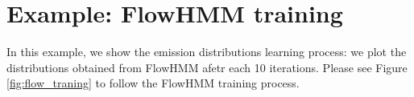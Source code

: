\documentclass[shortabstract]{iithesis}
\DeclareMathOperator*{\argmin}{arg\,min}
\begin{document}













\section{Example: FlowHMM training}

In this example, we show the emission distributions learning process: we plot the distributions obtained from FlowHMM afetr each 10 iterations. Please see Figure \ref{fig:flow_traning} to follow the FlowHMM training process. 
\end{document}
